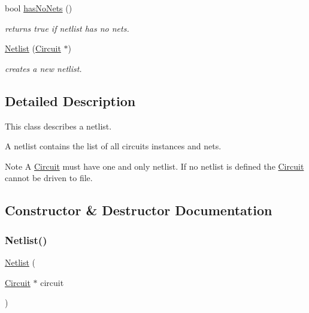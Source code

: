 \begin{DoxyCompactItemize}
\mbox{\label{class_open_chams_1_1_netlist_a36089e1b3a3f2d3f7c9dcc8e3c3bd6d8}} 
bool \hyperlink{class_open_chams_1_1_netlist_a36089e1b3a3f2d3f7c9dcc8e3c3bd6d8}{has\+No\+Nets} ()
\begin{DoxyCompactList}\small\item\em returns true if netlist has no nets. \end{DoxyCompactList}\item 
\hyperlink{class_open_chams_1_1_netlist_a202a04ceb6a7c0619590b329ba7773bd}{Netlist} (\hyperlink{class_open_chams_1_1_circuit}{Circuit} $\ast$)
\begin{DoxyCompactList}\small\item\em creates a new netlist. \end{DoxyCompactList}\end{DoxyCompactItemize}


\subsection{Detailed Description}
This class describes a netlist.

A netlist contains the list of all circuit\textquotesingle{}s instances and nets.

\begin{DoxyNote}{Note}
A \hyperlink{class_open_chams_1_1_circuit}{Circuit} must have one and only netlist. If no netlist is defined the \hyperlink{class_open_chams_1_1_circuit}{Circuit} cannot be driven to file. 
\end{DoxyNote}


\subsection{Constructor \& Destructor Documentation}
\mbox{\label{class_open_chams_1_1_netlist_a202a04ceb6a7c0619590b329ba7773bd}} 
\subsubsection{\texorpdfstring{Netlist()}{Netlist()}}
{\footnotesize\ttfamily \hyperlink{class_open_chams_1_1_netlist}{Netlist} (\begin{DoxyParamCaption}\item[{\hyperlink{class_open_chams_1_1_circuit}{Circuit} $\ast$}]{circuit }\end{DoxyParamCaption})}



